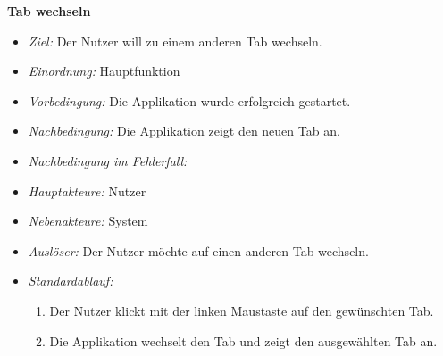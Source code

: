\textbf{Tab wechseln}
  \begin{itemize}
  \item \textit{Ziel:} Der Nutzer will zu einem anderen Tab wechseln.
  \item \textit{Einordnung:} Hauptfunktion
  \item \textit{Vorbedingung:} Die Applikation wurde erfolgreich gestartet.
  \item \textit{Nachbedingung:} Die Applikation zeigt den neuen Tab an.
  \item \textit{Nachbedingung im Fehlerfall:} 
  \item \textit{Hauptakteure:} Nutzer
  \item \textit{Nebenakteure:} System
  \item \textit{Ausl\"oser:} Der Nutzer m\"ochte auf einen anderen Tab wechseln.
  \item \textit{Standardablauf:}
    \begin{enumerate}
     \item Der Nutzer klickt mit der linken Maustaste auf den gew\"unschten Tab.
    \item Die Applikation wechselt den Tab und zeigt den ausgew\"ahlten Tab an.
  \end{enumerate}
  \end{itemize}